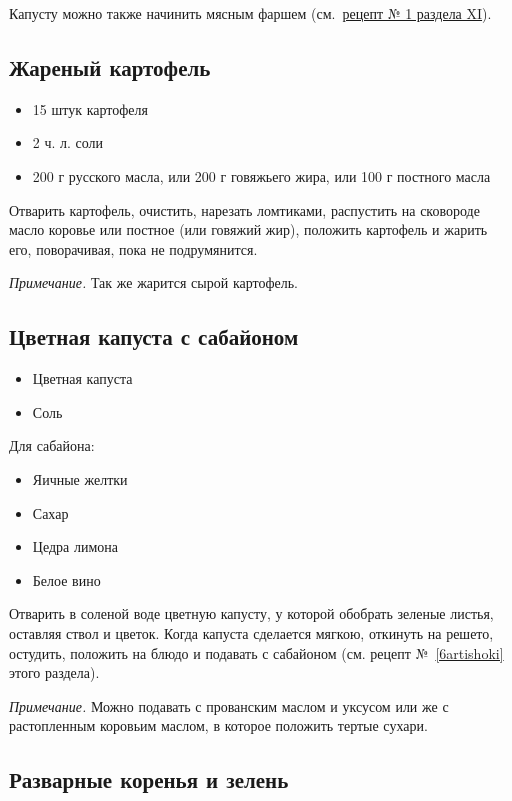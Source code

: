 Капусту можно также начинить мясным фаршем (см.~\hyperref[1farsh-gov]{рецепт № 1 раздела XI}). 

\subsection{Жареный картофель}

\begin{itemize}
	\item 15 штук картофеля 
    \item 2 ч. л. соли
    \item 200 г русского масла, или 200 г говяжьего жира, или 100 г постного масла
\end{itemize}

Отварить картофель, очистить, нарезать ломтиками, распустить на сковороде масло коровье или постное (или говяжий жир), положить картофель и жарить его, поворачивая, пока не подрумянится.

\emph{Примечание.} Так же жарится сырой картофель.

\subsection{Цветная капуста с сабайоном}

\begin{itemize}
	\item Цветная капуста 
    \item Соль
\end{itemize}

Для сабайона: 

\begin{itemize}
	\item Яичные желтки 
    \item Сахар 
    \item Цедра лимона 
    \item Белое вино
\end{itemize}

Отварить в соленой воде цветную капусту, у которой обобрать зеленые листья, оставляя ствол и цветок. Когда капуста сделается мягкою, откинуть на решето, остудить, положить на блюдо и подавать с сабайоном (см. рецепт №~\ref{6artishoki} этого раздела).

\emph{Примечание.} Можно подавать с прованским маслом и уксусом или же с растопленным коровьим маслом, в которое положить тертые сухари.

\subsection{Разварные коренья и зелень}

